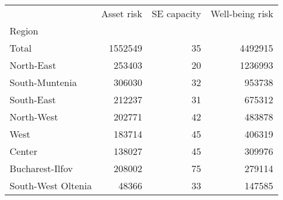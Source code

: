 \begin{tabular}{lrrr}
\toprule
{} &  Asset risk &  SE capacity &  Well-being risk \\
Region             &             &              &                  \\
\midrule
Total              &     1552549 &           35 &          4492915 \\
North-East         &      253403 &           20 &          1236993 \\
South-Muntenia     &      306030 &           32 &           953738 \\
South-East         &      212237 &           31 &           675312 \\
North-West         &      202771 &           42 &           483878 \\
West               &      183714 &           45 &           406319 \\
Center             &      138027 &           45 &           309976 \\
Bucharest-Ilfov    &      208002 &           75 &           279114 \\
South-West Oltenia &       48366 &           33 &           147585 \\
\bottomrule
\end{tabular}
